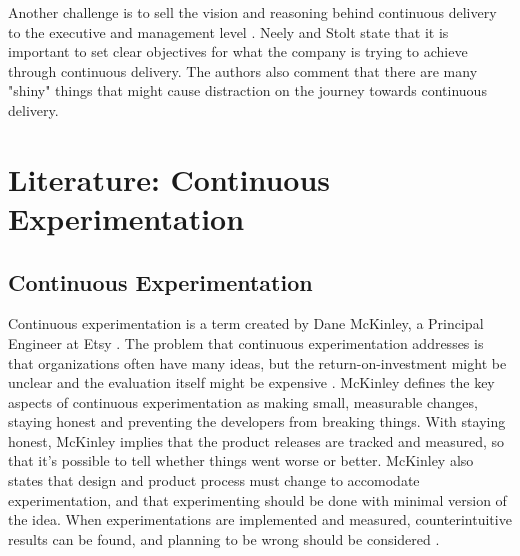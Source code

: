 \documentclass[english, grading]{tktltiki2}
\theoremstyle{definition}
\theoremstyle{remark}
\begin{document}
Another challenge is to sell the vision and reasoning behind continuous delivery to the executive and management level \cite{neely2013continuous}. Neely and Stolt state that it is important to set clear objectives for what the company is trying to achieve through continuous delivery. The authors also comment that there are many "shiny" things that might cause distraction on the journey towards continuous delivery. 



\section{Literature: Continuous Experimentation}

\subsection{Continuous Experimentation}

Continuous experimentation is a term created by Dane McKinley, a Principal Engineer at Etsy \cite{mcfunley}. The problem that continuous experimentation addresses is that organizations often have many ideas, but the return-on-investment might be unclear and the evaluation itself might be expensive \cite{kohavi2007practical}. McKinley defines the key aspects of continuous experimentation as making small, measurable changes, staying honest and preventing the developers from breaking things. With staying honest, McKinley implies that the product releases are tracked and measured, so that it's possible to tell whether things went worse or better. McKinley also states that design and product process must change to accomodate experimentation, and that experimenting should be done with minimal version of the idea. When experimentations are implemented and measured, counterintuitive results can be found, and planning to be wrong should be considered \cite{mcfunley}. 
\end{document}
